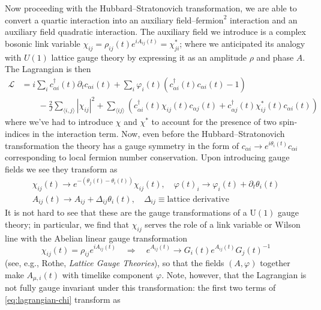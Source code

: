 \documentclass{report}
\begin{document}
Now proceeding with the Hubbard--Stratonovich transformation, we are able to 
convert a quartic interaction into an auxiliary field--$\text{fermion}^2$ interaction 
and an auxiliary field quadratic interaction. The auxiliary field we 
introduce is a complex bosonic link variable $ \chi_{ij} = \rho_{ij}(t) e^{iA_{ij}(t)} = \chi_{ji}^\ast$; 
where we anticipated its analogy with $ U(1) $ lattice gauge theory by
expressing it as an amplitude $ \rho $ and phase $ A $. The Lagrangian is then
\begin{align}\label{eq:lagrangian-chi}
	\mathcal{L}
		&=i\sum_i c_{\alpha i}^\dagger(t) \partial_t c_{\alpha i}(t)
			+ \sum_i \varphi_i(t) (c_{\alpha i}^\dagger (t) c_{\alpha i}(t) - 1)\\
				&\qquad - \frac{2}{J}\sum_{\langle i,j \rangle} |\chi_{ij}|^2
				+ \sum_{\langle ij \rangle} \left(
					c_{\alpha i}^\dagger(t) \chi_{ij} (t) c_{\alpha j} (t) 
					+ c_{\alpha j}^\dagger (t)\chi_{ij}^\ast(t) c_{\alpha i}(t)
				\right)\nonumber
\end{align}
where we've had to introduce $ \chi $ and $ \chi^\ast $ to account for the 
presence of two spin-indices in the interaction term. Now, even before the 
Hubbard--Stratonovich transformation the theory has a gauge symmetry in the 
form of $ c_{\alpha i} \rightarrow e^{i\theta_i (t)} c_{\alpha i} $
corresponding to local fermion number conservation. Upon introducing 
gauge fields we see they transform as
\begin{gather*}
	\chi_{ij}(t) \rightarrow e^{-(\theta_j(t) - \theta_i(t))}\chi_{ij}(t),\quad 
	\varphi(t)_i \rightarrow \varphi_i (t) + \partial_t \theta_i(t)\\ 
	A_{ij}(t) \rightarrow  A_{ij} + \Delta_{ij} \theta_i(t),\quad \Delta_{ij}\equiv\text{lattice derivative}
\end{gather*}
It is not hard to see that these are the gauge transformations of a $ \text{U}(1) $
gauge theory; in particular, we find that $ \chi_{ij} $ serves the role of a 
link variable or Wilson line with the Abelian linear gauge transformation 
\begin{equation*}
	\chi_{ij}(t) =\rho_{ij}e^{iA_{ij}(t)}\quad \Longrightarrow \quad 
	e^{A_{ij}(t)} \rightarrow G_i(t) e^{A_{ij}(t)} G_j(t)^{-1}
\end{equation*}
(see, e.g., Rothe, \textit{Lattice Gauge Theories}), so that the fields $ (A,\varphi) $
together make $ A_{\mu, i}(t) $ with timelike component $ \varphi $. Note, 
however, that the Lagrangian is not fully gauge invariant under this 
transformation: the first two terms of \cref{eq:lagrangian-chi} transform as 
\end{document}
